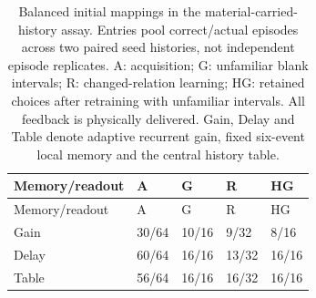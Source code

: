 \begingroup\small
\begin{longtable}{lllll}
\caption{Balanced initial mappings in the material-carried-history assay. Entries pool correct/actual episodes across two paired seed histories, not independent episode replicates. A: acquisition; G: unfamiliar blank intervals; R: changed-relation learning; HG: retained choices after retraining with unfamiliar intervals. All feedback is physically delivered. Gain, Delay and Table denote adaptive recurrent gain, fixed six-event local memory and the central history table.}\label{tab:local-history-main}\\
\toprule
Memory/readout & A & G & R & HG \\
\midrule
\endfirsthead
\toprule
Memory/readout & A & G & R & HG \\
\midrule
\endhead
Gain & 30/64 & 10/16 & 9/32 & 8/16 \\
Delay & 60/64 & 16/16 & 13/32 & 16/16 \\
Table & 56/64 & 16/16 & 16/32 & 16/16 \\
\bottomrule
\end{longtable}
\endgroup
